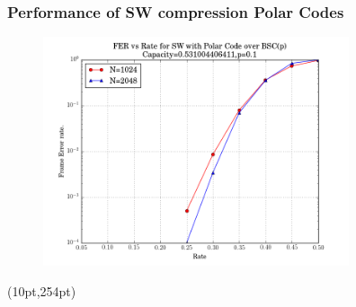 \documentclass[xcolor=dvipsnames]{beamer}
\newcommand\hyperback[1]{%
  \begin{textblock*}{\paperwidth}(10pt,254pt)
    \raggedright #1\hspace{.5em}
  \end{textblock*}}
\begin{document}
\begin{frame}[label = polarswperformance]
\frametitle{Performance of SW compression Polar Codes}
\begin{figure}
\centering
\includegraphics[width=9cm]{./swfer.png}
\end{figure}
\hyperback{\hyperlink{polarslepian}{}}
\end{frame}
\end{document}
